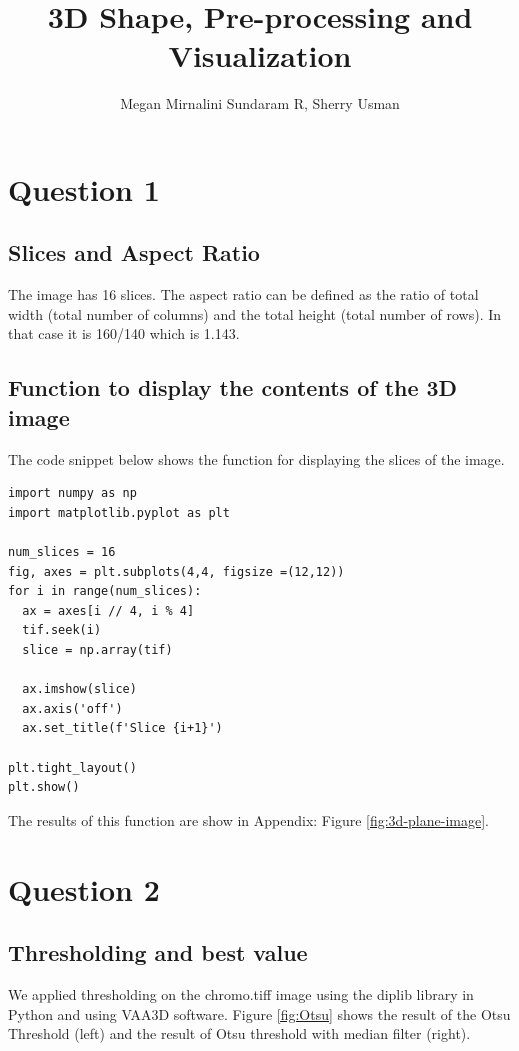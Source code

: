 \documentclass{article}
\title{3D Shape, Pre-processing and Visualization}
\author{Megan Mirnalini Sundaram R, Sherry Usman}
\begin{document}
\maketitle

\section*{Question 1}
\subsection*{Slices and Aspect Ratio}
The image has 16 slices. The aspect ratio can be defined as the ratio of total width (total number of columns) and the total height (total number of rows). In that case it is 160/140 which is 1.143. 

\subsection*{Function to display the contents of the 3D image} \label{sec:contents-3D_image}
The code snippet below shows the function for displaying the slices of the image.  
\begin{lstlisting}
import numpy as np
import matplotlib.pyplot as plt 

num_slices = 16
fig, axes = plt.subplots(4,4, figsize =(12,12))
for i in range(num_slices):
  ax = axes[i // 4, i % 4]
  tif.seek(i)
  slice = np.array(tif)

  ax.imshow(slice)
  ax.axis('off')
  ax.set_title(f'Slice {i+1}')

plt.tight_layout()
plt.show()
\end{lstlisting}

The results of this function are show in Appendix: Figure \ref{fig:3d-plane-image}. 
\section*{Question 2}
\subsection*{Thresholding and best value}
We applied thresholding on the chromo.tiff image using the diplib library in Python and using VAA3D software. Figure \ref{fig:Otsu} shows the result of the Otsu Threshold (left) and the result of Otsu threshold with median filter (right). 
\end{document}
